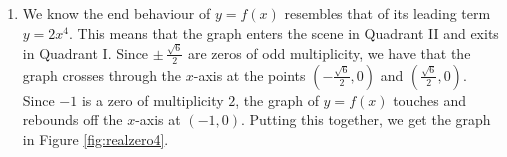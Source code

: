 {\begin{enumerate}
{so the quotient after dividing twice by $x+1$ is $2x^2-3$.}

\smallskip

Setting the quotient polynomial equal to zero yields $2x^2 - 3 = 0$, so that $x^2 = \frac{3}{2}$, or $x = \pm \, \frac{\sqrt{6}}{2}$.  Descartes' Rule of Signs tells us that the positive real zero we found, $\frac{\sqrt{6}}{2}$, has multiplicity $1$.  Descartes also tells us the total multiplicity of negative real zeros is $3$, which forces $-1$ to be a zero of multiplicity $2$ and $- \frac{\sqrt{6}}{2}$ to have multiplicity $1$.  

\item  We know the end behaviour of $y=f(x)$ resembles that of its leading term $y=2x^4$.  This means that the graph enters the scene in Quadrant II and exits in Quadrant I.  Since $\pm \, \frac{\sqrt{6}}{2}$ are zeros of odd multiplicity, we have that the graph crosses through the $x$-axis at the points $\left( -\frac{\sqrt{6}}{2}, 0 \right)$ and $\left( \frac{\sqrt{6}}{2}, 0 \right)$.  Since $-1$ is a zero of multiplicity $2$, the graph of $y=f(x)$ touches and rebounds off the $x$-axis at $(-1,0)$.  Putting this together, we get the graph in Figure \ref{fig:realzero4}.
\end{enumerate}
}


